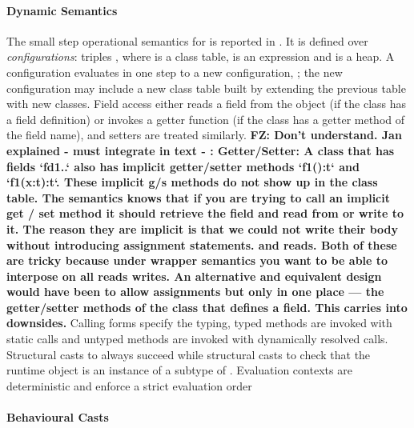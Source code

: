 \documentclass[acmlarge, anonymous, authordraft]{acmart}
\newcommand{\FZ}[1]{\textbf{FZ: #1}}
\begin{document}
\paragraph{Dynamic Semantics}
The small  step operational semantics for \kafka is reported in .
 It is defined over \emph{configurations}: triples \K\e\s, where \K is a class
table, \e is an expression and \s is a heap.  A configuration evaluates in one
step to a new configuration, \Reduce \K\e\s\Kp\ep\sp;  the new configuration may
include a new class table built by extending the previous table with new
classes. Field access either reads a field from the object (if the class has a
field definition) or invokes a getter function (if the class has a getter method
of the field name), and setters are treated similarly. \FZ{Don't understand.  Jan explained - must integrate in text - : Getter/Setter:    A class that has fields `fd1..`  also has implicit getter/setter methods `f1():t` and `f1(x:t):t`.  These implicit g/s methods do not show up in the class table. The semantics knows that if you are trying to call an implicit get / set method it should retrieve the field and read from or write to it.
The reason they are implicit is that we could not write their body without introducing assignment statements.
and reads.
Both of these are tricky because under wrapper semantics you want to be able to interpose on all reads writes.
An alternative and equivalent design would have been to allow assignments but only in one place — the getter/setter methods of the class that defines a field.  This carries into downsides.
} 
Calling forms specify the
typing, typed methods are invoked with static calls and untyped methods are
invoked with dynamically resolved calls. Structural casts to \any always succeed
while structural casts to \C check that the runtime object is an instance of a
subtype of \C.  
Evaluation contexts are deterministic and enforce a strict evaluation order

\paragraph{Behavioural Casts}


\newcommand{\bscast}[2]{\EM{\BehCast{#1}{{#2}}}}
\end{document}
